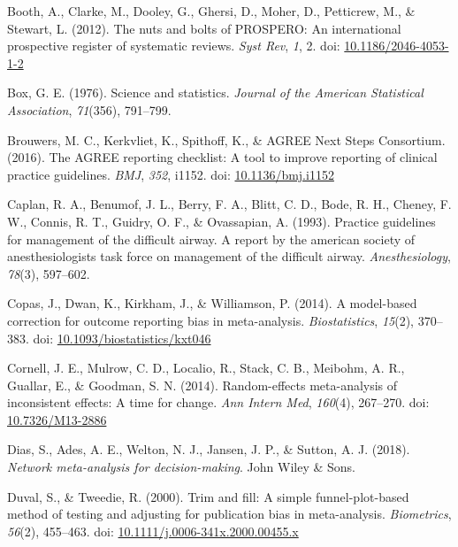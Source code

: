 \documentclass[
  letterpaper,
  DIV=11,
  numbers=noendperiod]{scrreprt}
\newlength{\cslhangindent}
\newlength{\cslentryspacingunit} %
\newenvironment{CSLReferences}[2] %
 {%
  \setlength{\parindent}{0pt}
  \ifodd #1
  \let\oldpar\par
  \def\par{\hangindent=\cslhangindent\oldpar}
  \fi
  \setlength{\parskip}{#2\cslentryspacingunit}
 }%
 {}
\begin{document}
\begin{CSLReferences}{1}{0}
\leavevmode{}%
Booth, A., Clarke, M., Dooley, G., Ghersi, D., Moher, D., Petticrew, M.,
\& Stewart, L. (2012). The nuts and bolts of PROSPERO: An international
prospective register of systematic reviews. \emph{Syst Rev}, \emph{1},
2. doi:
\href{https://doi.org/10.1186/2046-4053-1-2}{10.1186/2046-4053-1-2}

\leavevmode{}%
Box, G. E. (1976). Science and statistics. \emph{Journal of the American
Statistical Association}, \emph{71}(356), 791--799.

\leavevmode{}%
Brouwers, M. C., Kerkvliet, K., Spithoff, K., \& AGREE Next Steps
Consortium. (2016). The {AGREE} reporting checklist: A tool to improve
reporting of clinical practice guidelines. \emph{BMJ}, \emph{352},
i1152. doi: \href{https://doi.org/10.1136/bmj.i1152}{10.1136/bmj.i1152}

\leavevmode{}%
Caplan, R. A., Benumof, J. L., Berry, F. A., Blitt, C. D., Bode, R. H.,
Cheney, F. W., Connis, R. T., Guidry, O. F., \& Ovassapian, A. (1993).
Practice guidelines for management of the difficult airway. A report by
the american society of anesthesiologists task force on management of
the difficult airway. \emph{Anesthesiology}, \emph{78}(3), 597--602.

\leavevmode{}%
Copas, J., Dwan, K., Kirkham, J., \& Williamson, P. (2014). A
model-based correction for outcome reporting bias in meta-analysis.
\emph{Biostatistics}, \emph{15}(2), 370--383. doi:
\href{https://doi.org/10.1093/biostatistics/kxt046}{10.1093/biostatistics/kxt046}

\leavevmode{}%
Cornell, J. E., Mulrow, C. D., Localio, R., Stack, C. B., Meibohm, A.
R., Guallar, E., \& Goodman, S. N. (2014). Random-effects meta-analysis
of inconsistent effects: A time for change. \emph{Ann Intern Med},
\emph{160}(4), 267--270. doi:
\href{https://doi.org/10.7326/M13-2886}{10.7326/M13-2886}

\leavevmode{}%
Dias, S., Ades, A. E., Welton, N. J., Jansen, J. P., \& Sutton, A. J.
(2018). \emph{Network meta-analysis for decision-making}. John Wiley \&
Sons.

\leavevmode{}%
Duval, S., \& Tweedie, R. (2000). Trim and fill: A simple
funnel-plot-based method of testing and adjusting for publication bias
in meta-analysis. \emph{Biometrics}, \emph{56}(2), 455--463. doi:
\href{https://doi.org/10.1111/j.0006-341x.2000.00455.x}{10.1111/j.0006-341x.2000.00455.x}


\end{CSLReferences}
\end{document}

